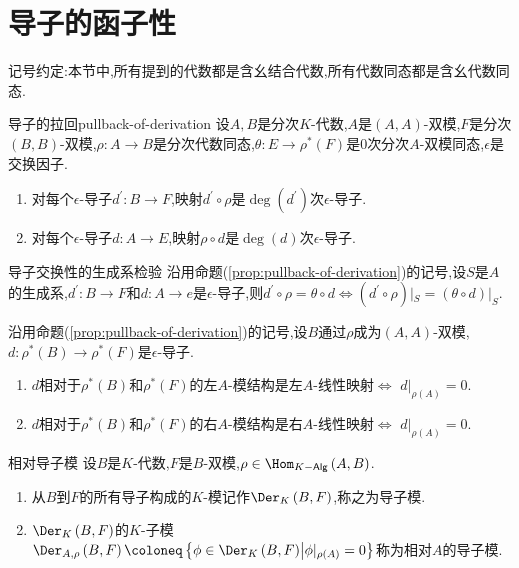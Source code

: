 \section{导子的函子性}

记号约定:本节中,所有提到的代数都是含幺结合代数,所有代数同态都是含幺代数同态.

\begin{proposition}{导子的拉回}{pullback-of-derivation}
	设$A,B$是分次$K$-代数,$A$是$\left(A,A\right)$-双模,$F$是分次$\left(B,B\right)$-双模,$\rho:A\to B$是分次代数同态,$\theta:E\to\rho^{\ast}\left(F\right)$是$0$次分次$A$-双模同态,$\epsilon$是交换因子.
	\begin{enumerate}
		\item 对每个$\epsilon$-导子$d^{\prime}:B\to F$,映射$d^{\prime}\circ\rho$是$\deg\left(d^{\prime}\right)$次$\epsilon$-导子.
		\item 对每个$\epsilon$-导子$d:A\to E$,映射$\rho\circ d$是$\deg\left(d\right)$次$\epsilon$-导子.
	\end{enumerate}
\end{proposition}

\begin{corollary}{导子交换性的生成系检验}{}
	沿用命题(\cref{prop:pullback-of-derivation})的记号,设$S$是$A$的生成系,$d^{\prime}:B\to F$和$d:A\to e$是$\epsilon$-导子,则$d^{\prime}\circ\rho=\theta\circ d\iff \left(d^{\prime}\circ\rho\right)|_{S}=\left(\theta\circ d\right)|_{S}$.
\end{corollary}

\begin{proposition}{}{}
	沿用命题(\cref{prop:pullback-of-derivation})的记号,设$B$通过$\rho$成为$\left(A,A\right)$-双模,$d:\rho^{\ast}\left(B\right)\to\rho^{\ast}\left(F\right)$是$\epsilon$-导子.
	\begin{enumerate}
		\item $d$相对于$\rho^{\ast}\left(B\right)$和$\rho^{\ast}\left(F\right)$的左$A$-模结构是左$A$-线性映射$\iff$ $d|_{\rho\left(A\right)}=0$.
		\item $d$相对于$\rho^{\ast}\left(B\right)$和$\rho^{\ast}\left(F\right)$的右$A$-模结构是右$A$-线性映射$\iff$ $d|_{\rho\left(A\right)}=0$.
	\end{enumerate}
\end{proposition}

\begin{definition}{相对导子模}{}
	设$B$是$K$-代数,$F$是$B$-双模,$\rho\in\Hom_{K-\mathsf{Alg}}\left(A,B\right)$.
	\begin{enumerate}
		\item 从$B$到$F$的所有导子构成的$K$-模记作$\Der_{K}\left(B,F\right)$,称之为导子模.
		\item $\Der_{K}\left(B,F\right)$的$K$-子模$\Der_{A,\rho}\left(B,F\right)\coloneq\left\{\phi\in\Der_{K}\left(B,F\right)\middle|\phi|_{\rho\left(A\right)}=0\right\}$称为相对$A$的导子模.
	\end{enumerate}
\end{definition}

